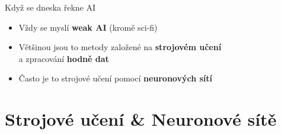 \documentclass[aspectratio=169,dvipsnames]{beamer}
\begin{document}

%
%
%
%


\begin{frame}{Když se dneska řekne AI}

    \Large

    \begin{itemize}[<+->]

        \item Vždy se myslí \textbf{weak AI} {\small (kromě sci-fi)} \\[1em]

        \item Většinou jsou to metody založené na \textbf{strojovém učení}  \\  \quad a zpracování
            \textbf{hodně dat} \\[1em]

        \item Často je to strojové učení pomocí \textbf{neuronových sítí}

    \end{itemize}


\end{frame}



\section[Strojové učení]{Strojové učení \& Neuronové sítě}
\end{document}
